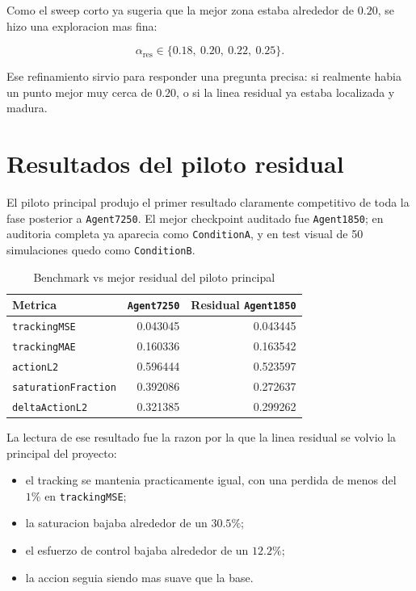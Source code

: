 \documentclass[11pt,a4paper]{article}
\begin{document}
Como el sweep corto ya sugeria que la mejor zona estaba alrededor de \(0.20\), se hizo una exploracion mas fina:

\[
\alpha_{\mathrm{res}} \in \{0.18,\ 0.20,\ 0.22,\ 0.25\}.
\]

Ese refinamiento sirvio para responder una pregunta precisa: si realmente habia un punto mejor muy cerca de \(0.20\), o si la linea residual ya estaba localizada y madura.

\section{Resultados del piloto residual}

El piloto principal produjo el primer resultado claramente competitivo de toda la fase posterior a \texttt{Agent7250}. El mejor checkpoint auditado fue \texttt{Agent1850}; en auditoria completa ya aparecia como \texttt{ConditionA}, y en test visual de 50 simulaciones quedo como \texttt{ConditionB}.

\begin{table}[H]
\centering
\caption{Benchmark vs mejor residual del piloto principal}
\begin{tabular}{lrr}
\toprule
Metrica & \texttt{Agent7250} & Residual \texttt{Agent1850} \\
\midrule
\texttt{trackingMSE} & 0.043045 & 0.043445 \\
\texttt{trackingMAE} & 0.160336 & 0.163542 \\
\texttt{actionL2} & 0.596444 & 0.523597 \\
\texttt{saturationFraction} & 0.392086 & 0.272637 \\
\texttt{deltaActionL2} & 0.321385 & 0.299262 \\
\bottomrule
\end{tabular}
\end{table}

La lectura de ese resultado fue la razon por la que la linea residual se volvio la principal del proyecto:

\begin{itemize}[leftmargin=1.6em]
\item el tracking se mantenia practicamente igual, con una perdida de menos del \(1\%\) en \texttt{trackingMSE};
\item la saturacion bajaba alrededor de un \(30.5\%\);
\item el esfuerzo de control bajaba alrededor de un \(12.2\%\);
\item la accion seguia siendo mas suave que la base.
\end{itemize}
\end{document}
